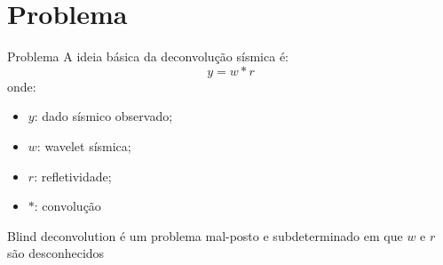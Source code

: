 \section{Problema}
\begin{frame}{Problema}
    A ideia básica da deconvolução sísmica é:
    \begin{equation}
        y = w * r
    \end{equation}
    onde:
    \begin{itemize}
        \item \(y\): dado sísmico observado;
        \item \(w\): wavelet sísmica;
        \item \(r\): refletividade;
        \item \(*\): convolução
    \end{itemize}
    Blind deconvolution é um problema mal-posto e subdeterminado 
    em que $w$ e $r$ são desconhecidos
\end{frame}